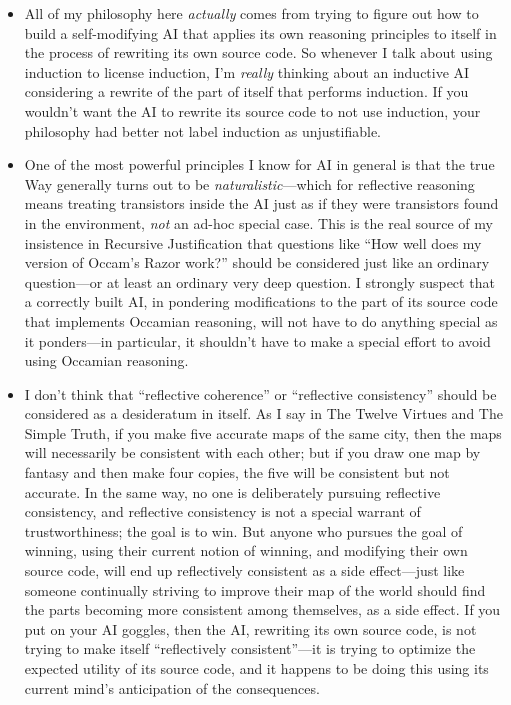 \begin{itemize}
\item {
 All of my philosophy here \textit{actually} comes from trying to
figure out how to build a self-modifying AI that applies its own
reasoning principles to itself in the process of rewriting its own
source code. So whenever I talk about using induction to license
induction, I'm \textit{really} thinking about an
inductive AI considering a rewrite of the part of itself that performs
induction. If you wouldn't want the AI to rewrite its
source code to not use induction, your philosophy had better not label
induction as unjustifiable.}

\item {
 One of the most powerful principles I know for AI in general is
that the true Way generally turns out to be
\textit{naturalistic}{}---which for reflective reasoning means treating
transistors inside the AI just as if they were transistors found in the
environment, \textit{not} an ad-hoc special case. This is the real
source of my insistence in Recursive Justification that questions like
``How well does my version of Occam's
Razor work?'' should be considered just like an
ordinary question---or at least an ordinary very deep question. I
strongly suspect that a correctly built AI, in pondering modifications
to the part of its source code that implements Occamian reasoning, will
not have to do anything special as it ponders---in particular, it
shouldn't have to make a special effort to avoid using
Occamian reasoning.}

\item {
 I don't think that ``reflective
coherence'' or ``reflective
consistency'' should be considered as a desideratum
in itself. As I say in The Twelve Virtues and The Simple Truth, if you
make five accurate maps of the same city, then the maps will
necessarily be consistent with each other; but if you draw one map by
fantasy and then make four copies, the five will be consistent but not
accurate. In the same way, no one is deliberately pursuing reflective
consistency, and reflective consistency is not a special warrant of
trustworthiness; the goal is to win. But anyone who pursues the goal of
winning, using their current notion of winning, and modifying their own
source code, will end up reflectively consistent as a side
effect---just like someone continually striving to improve their map of
the world should find the parts becoming more consistent among
themselves, as a side effect. If you put on your AI goggles, then the
AI, rewriting its own source code, is not trying to make itself
``reflectively consistent''---it is
trying to optimize the expected utility of its source code, and it
happens to be doing this using its current mind's
anticipation of the consequences.}


\end{itemize}
